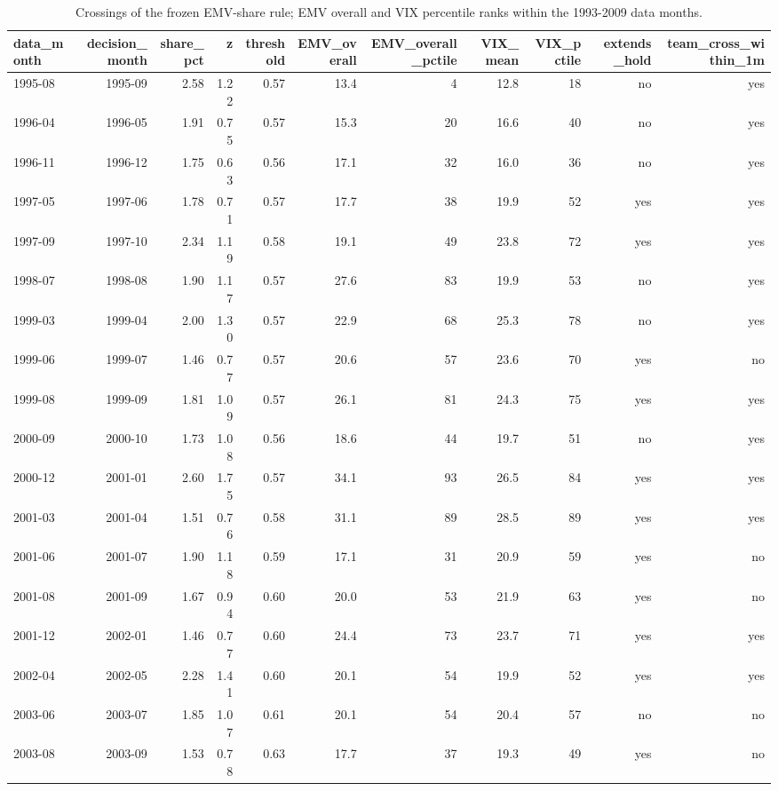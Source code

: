 \begin{table}[htbp]\centering\small
\caption{Crossings of the frozen EMV-share rule; EMV overall and VIX percentile ranks within the 1993-2009 data months.}
\label{tab:m8_crossings}
\begin{tabular}{lrrrrrrrrrr}
\toprule
data\_month & decision\_month & share\_pct & z & threshold & EMV\_overall & EMV\_overall\_pctile & VIX\_mean & VIX\_pctile & extends\_hold & team\_cross\_within\_1m \\
\midrule
1995-08 & 1995-09 & 2.58 & 1.22 & 0.57 & 13.4 & 4 & 12.8 & 18 & no & yes \\
1996-04 & 1996-05 & 1.91 & 0.75 & 0.57 & 15.3 & 20 & 16.6 & 40 & no & yes \\
1996-11 & 1996-12 & 1.75 & 0.63 & 0.56 & 17.1 & 32 & 16.0 & 36 & no & yes \\
1997-05 & 1997-06 & 1.78 & 0.71 & 0.57 & 17.7 & 38 & 19.9 & 52 & yes & yes \\
1997-09 & 1997-10 & 2.34 & 1.19 & 0.58 & 19.1 & 49 & 23.8 & 72 & yes & yes \\
1998-07 & 1998-08 & 1.90 & 1.17 & 0.57 & 27.6 & 83 & 19.9 & 53 & no & yes \\
1999-03 & 1999-04 & 2.00 & 1.30 & 0.57 & 22.9 & 68 & 25.3 & 78 & no & yes \\
1999-06 & 1999-07 & 1.46 & 0.77 & 0.57 & 20.6 & 57 & 23.6 & 70 & yes & no \\
1999-08 & 1999-09 & 1.81 & 1.09 & 0.57 & 26.1 & 81 & 24.3 & 75 & yes & yes \\
2000-09 & 2000-10 & 1.73 & 1.08 & 0.56 & 18.6 & 44 & 19.7 & 51 & no & yes \\
2000-12 & 2001-01 & 2.60 & 1.75 & 0.57 & 34.1 & 93 & 26.5 & 84 & yes & yes \\
2001-03 & 2001-04 & 1.51 & 0.76 & 0.58 & 31.1 & 89 & 28.5 & 89 & yes & yes \\
2001-06 & 2001-07 & 1.90 & 1.18 & 0.59 & 17.1 & 31 & 20.9 & 59 & yes & no \\
2001-08 & 2001-09 & 1.67 & 0.94 & 0.60 & 20.0 & 53 & 21.9 & 63 & yes & no \\
2001-12 & 2002-01 & 1.46 & 0.77 & 0.60 & 24.4 & 73 & 23.7 & 71 & yes & yes \\
2002-04 & 2002-05 & 2.28 & 1.41 & 0.60 & 20.1 & 54 & 19.9 & 52 & yes & yes \\
2003-06 & 2003-07 & 1.85 & 1.07 & 0.61 & 20.1 & 54 & 20.4 & 57 & no & no \\
2003-08 & 2003-09 & 1.53 & 0.78 & 0.63 & 17.7 & 37 & 19.3 & 49 & yes & no \\

\end{tabular}
\end{table}
